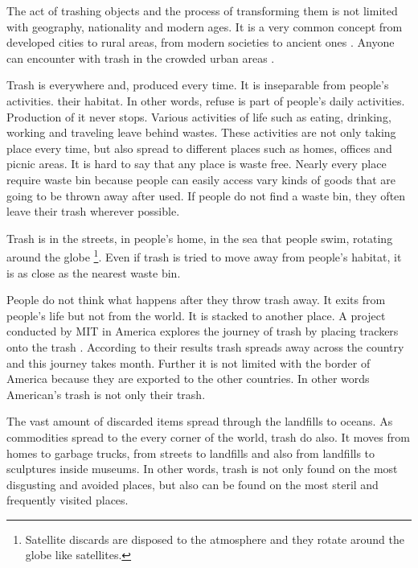 The act of trashing objects and the process of transforming them is not limited with geography, nationality and modern ages. It is a very common concept from developed cities to rural areas, from modern societies to ancient ones \citep[33]{rathje1992rubbish}. Anyone can encounter with trash in the crowded urban areas  \citep[16]{cerny1996recycled}.

Trash is everywhere and, produced every time. It is inseparable from people's activities.  \citep[xxv]{zimring2012encyclopedia} their habitat. In other words, refuse is part of people's daily activities. Production of it never stops. Various activities of life such as eating, drinking, working and traveling leave behind wastes. These activities are not only taking place every time, but also spread to different places such as homes, offices and picnic areas. It is hard to say that any place is waste free. Nearly every place require waste bin because people can easily access vary kinds of goods that are going to be thrown away after used. If people do not find a waste bin, they often leave their trash wherever possible.

Trash is in the streets, in people's home, in the sea that people swim, rotating around the globe \footnote{Satellite discards are disposed to the atmosphere and they rotate around the globe like satellites.}. Even if trash is tried to move away from people's habitat, it is as close as the nearest waste bin.

People do not think what happens after they throw trash away.  It exits from people's life but not from the world. It is stacked to another place. A project conducted by MIT in America explores the journey of trash by placing trackers onto the trash \citep{chen2009mit}. According to their results trash spreads away across the country and this journey takes month. Further it is not limited with the border of America because they are exported to the other countries. In other words American's trash is not only their trash.

The vast amount of discarded items spread through the landfills to oceans. As commodities spread to the every corner of the world, trash do also. It moves from homes to garbage trucks, from streets to landfills and also from landfills to sculptures inside museums. In other words, trash is not only found on the most disgusting and avoided places, but also can be found on the most steril and frequently visited places.

